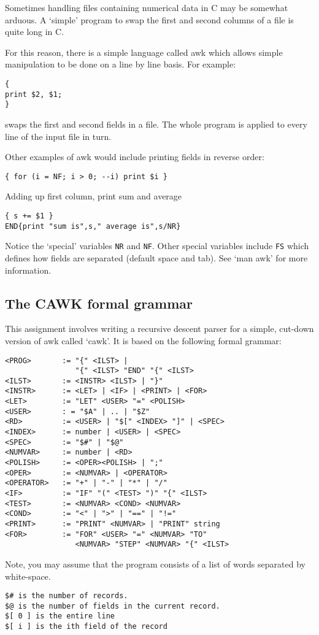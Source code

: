 

Sometimes handling files containing numerical data in C
may be somewhat arduous. A `simple' program to swap the first
and second columns of a file is quite long in C.

For this reason, there is a simple language called awk which
allows simple manipulation to be done on a line by line basis.
For example:
\begin{verbatim}
{
print $2, $1;
}
\end{verbatim}
swaps the first and second fields in a file.
The whole program is applied to every line of the input file in turn.

Other examples of awk would include printing fields in reverse order:
\begin{verbatim}
{ for (i = NF; i > 0; --i) print $i }
\end{verbatim}

\noindent Adding up first column, print sum and average
\begin{verbatim}
{ s += $1 }
END{print "sum is",s," average is",s/NR}
\end{verbatim}

\noindent Notice the `special' variables \verb^NR^ and \verb^NF^.
Other special variables include \verb^FS^ which defines how
fields are separated (default space and tab).
See `man awk' for more information.

\subsection*{The CAWK formal grammar}

This assignment involves writing a recursive descent parser
for a simple, cut-down version of awk called `cawk'. It is based
on the following formal grammar:

{\small
\begin{verbatim}
<PROG>       := "{" <ILST> |
                "{" <ILST> "END" "{" <ILST>
<ILST>       := <INSTR> <ILST> | "}"
<INSTR>      := <LET> | <IF> | <PRINT> | <FOR>
<LET>        := "LET" <USER> "=" <POLISH> 
<USER>       : = "$A" | .. | "$Z"
<RD>         := <USER> | "$[" <INDEX> "]" | <SPEC>
<INDEX>      := number | <USER> | <SPEC>
<SPEC>       := "$#" | "$@"
<NUMVAR>     := number | <RD>
<POLISH>     := <OPER><POLISH> | ";"
<OPER>       := <NUMVAR> | <OPERATOR>
<OPERATOR>   := "+" | "-" | "*" | "/"
<IF>         := "IF" "(" <TEST> ")" "{" <ILST>
<TEST>       := <NUMVAR> <COND> <NUMVAR>
<COND>       := "<" | ">" | "==" | "!="
<PRINT>      := "PRINT" <NUMVAR> | "PRINT" string
<FOR>        := "FOR" <USER> "=" <NUMVAR> "TO"
                <NUMVAR> "STEP" <NUMVAR> "{" <ILST>
\end{verbatim}

\noindent Note, you may assume that the program consists of
a list of words separated by white-space.
\begin{verbatim}
$# is the number of records.
$@ is the number of fields in the current record.
$[ 0 ] is the entire line
$[ i ] is the ith field of the record 
\end{verbatim}
}

